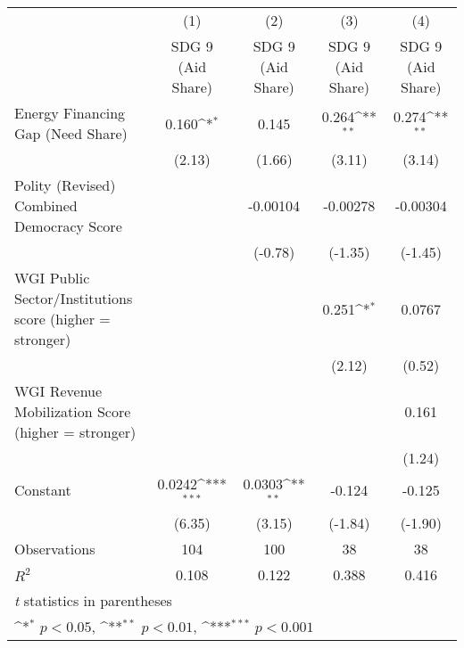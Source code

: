 {
\def\sym#1{\ifmmode^{#1}\else\(^{#1}\)\fi}
\begin{tabular}{l*{4}{c}}
\hline\hline
                &\multicolumn{1}{c}{(1)}&\multicolumn{1}{c}{(2)}&\multicolumn{1}{c}{(3)}&\multicolumn{1}{c}{(4)}\\
                &\multicolumn{1}{c}{SDG 9 (Aid Share)}&\multicolumn{1}{c}{SDG 9 (Aid Share)}&\multicolumn{1}{c}{SDG 9 (Aid Share)}&\multicolumn{1}{c}{SDG 9 (Aid Share)}\\
\hline
Energy Financing Gap (Need Share)&    0.160\sym{*}  &    0.145         &    0.264\sym{**} &    0.274\sym{**} \\
                &   (2.13)         &   (1.66)         &   (3.11)         &   (3.14)         \\
[1em]
Polity (Revised) Combined Democracy Score&                  & -0.00104         & -0.00278         & -0.00304         \\
                &                  &  (-0.78)         &  (-1.35)         &  (-1.45)         \\
[1em]
WGI Public Sector/Institutions score (higher = stronger)&                  &                  &    0.251\sym{*}  &   0.0767         \\
                &                  &                  &   (2.12)         &   (0.52)         \\
[1em]
WGI Revenue Mobilization Score (higher = stronger)&                  &                  &                  &    0.161         \\
                &                  &                  &                  &   (1.24)         \\
[1em]
Constant        &   0.0242\sym{***}&   0.0303\sym{**} &   -0.124         &   -0.125         \\
                &   (6.35)         &   (3.15)         &  (-1.84)         &  (-1.90)         \\
\hline
Observations    &      104         &      100         &       38         &       38         \\
\(R^{2}\)       &    0.108         &    0.122         &    0.388         &    0.416         \\
\hline\hline
\multicolumn{5}{l}{\footnotesize \textit{t} statistics in parentheses}\\
\multicolumn{5}{l}{\footnotesize \sym{*} \(p<0.05\), \sym{**} \(p<0.01\), \sym{***} \(p<0.001\)}\\
\end{tabular}
}
